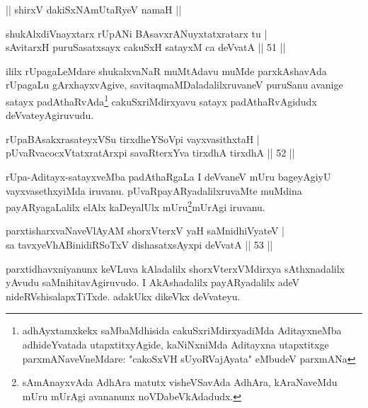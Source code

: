 \begin{center}%
|| shirxV dakiSxNAmUtaRyeV namaH ||
\end{center}


\begin{shl}
shukAlxdiVnayxtarx rUpANi BAsavxrANuyxtatxratarx tu |\\
sAvitarxH puruSasatxsayx cakuSxH satayxM ca deVvatA \hfill || 51 ||
\end{shl}

\begin{artha}
ililx rUpagaLeMdare shukalxvaNaR muMtAdavu muMde parxkAshavAda rUpagaLu gArxhayxvAgive, savitaqmaMDaladalilxruvaneV puruSanu avanige satayx padAthaRvAda\footnote[1]{adhAyxtamxkekx saMbaMdhisida cakuSxriMdirxyadiMda AditayxneMba adhideYvatada utapxtitxyAgide, kaNiNxniMda Aditayxna utapxtitxge parxmANaveVneMdare: "cakoSxVH sUyoRVajAyata" eMbudeV parxmANa} cakuSxriMdirxyavu satayx padAthaRvAgidudx deVvateyAgiruvudu.
\end{artha}


\begin{shl}
rUpaBAsakxrasateyxVSu tirxdheYSoV\s pi vayxvasithxtaH |\\
pUvaRvacocxVtatxratArxpi savaRterxYva tirxdhA tirxdhA \hfill || 52 ||
\end{shl}

\begin{artha}
rUpa-Aditayx-satayxveMba padAthaRgaLa I deVvaneV mUru bageyAgiyU vayxvasethxyiMda iruvanu. pUvaRpayARyadalilxruvaMte muMdina payARyagaLalilx elAlx kaDeyalUlx mUru\footnote[2]{sAmAnayxvAda AdhAra matutx visheVSavAda AdhAra, kAraNaveMdu mUru mUrAgi avananunx noVDabeVkAdadudx.}mUrAgi iruvanu.
\end{artha}


\begin{shl}
parxtisharxvaNaveVlAyAM shorxVterxV yaH saMnidhiVyateV |\\
sa tavxyeVhABinidiRSoTxV dishasatxsAyxpi deVvatA \hfill || 53 ||
\end{shl}

\begin{artha}
parxtidhavxniyanunx keVLuva kAladalilx shorxVterxVMdirxya sAthxnadalilx yAvudu saMnihitavAgiruvudo. I AkAshadalilx payARyadalilx adeV nideRVshisalapxTiTxde. adakUkx dikeVkx deVvateyu.
\end{artha}

